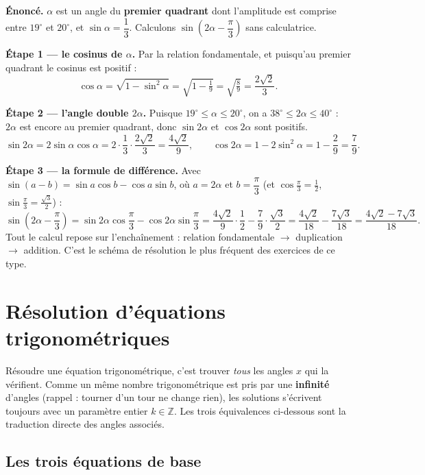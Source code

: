 \documentclass[11pt,a4paper]{article}
\newcommand{\degr}{^{\circ}}
\newcommand{\Z}{\mathbb{Z}}
\begin{document}
\begin{exemple}[un calcul complet : $\sin\!\left(2\alpha-\dfrac{\pi}{3}\right)$ avec $\sin\alpha=\dfrac13$]
\textbf{Énoncé.} $\alpha$ est un angle du \textbf{premier quadrant} dont l'amplitude est comprise entre
$19\degr$ et $20\degr$, et $\sin\alpha=\dfrac13$. Calculons $\sin\!\left(2\alpha-\dfrac{\pi}{3}\right)$
sans calculatrice.

\smallskip
\textbf{Étape 1 --- le cosinus de $\alpha$.} Par la relation fondamentale, et puisqu'au premier
quadrant le cosinus est positif :
\[
\cos\alpha=\sqrt{1-\sin^2\alpha}=\sqrt{1-\tfrac19}=\sqrt{\tfrac89}=\frac{2\sqrt2}{3}.
\]

\textbf{Étape 2 --- l'angle double $2\alpha$.} Puisque $19\degr\le\alpha\le20\degr$, on a
$38\degr\le2\alpha\le40\degr$ : $2\alpha$ est encore au premier quadrant, donc $\sin2\alpha$ et
$\cos2\alpha$ sont positifs.
\[
\sin2\alpha=2\sin\alpha\cos\alpha=2\cdot\frac13\cdot\frac{2\sqrt2}{3}=\frac{4\sqrt2}{9},
\qquad
\cos2\alpha=1-2\sin^2\alpha=1-\frac29=\frac79.
\]

\textbf{Étape 3 --- la formule de différence.} Avec $\sin(a-b)=\sin a\cos b-\cos a\sin b$, où
$a=2\alpha$ et $b=\dfrac{\pi}{3}$ (et $\cos\tfrac{\pi}{3}=\tfrac12$, $\sin\tfrac{\pi}{3}=\tfrac{\sqrt3}{2}$) :
\[
\sin\!\left(2\alpha-\frac{\pi}{3}\right)
=\sin2\alpha\cos\frac{\pi}{3}-\cos2\alpha\sin\frac{\pi}{3}
=\frac{4\sqrt2}{9}\cdot\frac12-\frac79\cdot\frac{\sqrt3}{2}
=\frac{4\sqrt2}{18}-\frac{7\sqrt3}{18}=\boxed{\frac{4\sqrt2-7\sqrt3}{18}}.
\]
Tout le calcul repose sur l'enchaînement : relation fondamentale $\to$ duplication $\to$ addition.
C'est le schéma de résolution le plus fréquent des exercices de ce type.
\end{exemple}

\section{Résolution d'équations trigonométriques}
Résoudre une équation trigonométrique, c'est trouver \emph{tous} les angles $x$ qui la vérifient.
Comme un même nombre trigonométrique est pris par une \textbf{infinité} d'angles (rappel : tourner
d'un tour ne change rien), les solutions s'écrivent toujours avec un paramètre entier $k\in\Z$.
Les trois équivalences ci-dessous sont la traduction directe des angles associés.

\subsection{Les trois équations de base}
\end{document}
